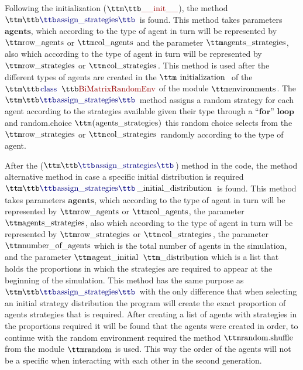 Following the initialization ($\pythoninline{\_\_init\_\_}$), the method $\pythoninline{assign\_strategies}$ is found. This method takes parameters $\textbf{agents}$, which according to the type of agent in turn will be represented by $\pythoninline{row\_agents}$ or $\pythoninline{col\_agents}$  and the parameter $\pythoninline{agents\_strategies}$, also which according to the type of agent in turn will be represented by $\pythoninline{row\_strategies}$ or $\pythoninline{col\_strategies}$. This method is used after the different types of agents are created in the $\pythoninline{initialization}$ of the $\pythoninline{class BiMatrixRandomEnv}$ of the module $\pythoninline{environments}$. The $\pythoninline{assign\_strategies}$ method assigns a random strategy for each agent according to the strategies available given their type through a $\textbf{``for'' loop}$ and random.choice $\pythoninline{(agents\_strategies)}$ this random choice selects from the $\pythoninline{row\_strategies}$ or $\pythoninline{col\_strategies}$ randomly according to the type of agent.

After the ($\pythoninline{assign\_strategies}$) method in the code, the method alternative method in case a specific initial distribution is required  $\pythoninline{assign\_strategies\_initial\_distribution}$ is found. This method takes parameters $\textbf{agents}$, which according to the type of agent in turn will be represented by $\pythoninline{row\_agents}$ or $\pythoninline{col\_agents}$, the parameter $\pythoninline{agents\_strategies}$, also which according to the type of agent in turn will be represented by $\pythoninline{row\_strategies}$ or $\pythoninline{col\_strategies}$, the parameter $\pythoninline{number\_of\_agents}$ which is the total number of agents in the simulation, and the parameter $\pythoninline{agent\_initial}$ $\pythoninline{\_distribution}$ which is a list that holds the proportions in which the strategies are required to appear at the beginning of the simulation. This method has the same purpose as $\pythoninline{assign\_strategies}$ with the only difference that when selecting an initial strategy distribution the program will create the exact proportion of agents strategies that is required. After creating a list of agents with strategies in the proportions required it will be found that the agents were created in order, to continue with the random environment required the method $\pythoninline{random.shuffle}$ from the module $\pythoninline{random}$ is used. This way the order of the agents will not be a specific when interacting with each other in the second generation.

